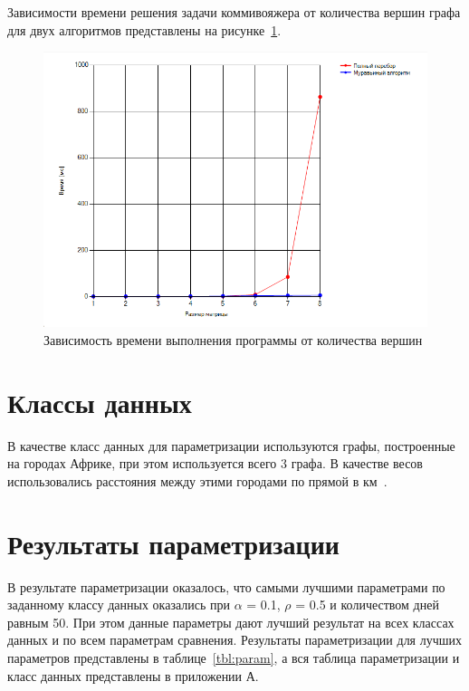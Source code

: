 \clearpage

Зависимости времени решения задачи коммивояжера от количества вершин графа для двух алгоритмов представлены на рисунке~\ref{fig:tm}.
\begin{figure}[H]
    \centering
    \includegraphics[width=1\linewidth]{img/graph-1.png}
    \caption{Зависимость времени выполнения программы от количества вершин}
    \label{fig:tm}
\end{figure}


\section{Классы данных}
В качестве класс данных для параметризации используются графы, построенные на городах Африке, при этом используется всего 3 графа. В качестве весов использовались расстояния между этими городами по прямой в км~\cite{maps}.

\section{Результаты параметризации}
В результате параметризации оказалось, что самыми лучшими параметрами по заданному классу данных оказались при $\alpha$ = 0.1, $\rho$ = 0.5 и количеством дней равным 50. При этом данные параметры дают лучший результат на всех классах данных и по всем параметрам сравнения. Результаты параметризации для лучших параметров представлены в таблице~\ref{tbl:param}, а
вся таблица параметризации и класс данных представлены в приложении А.


